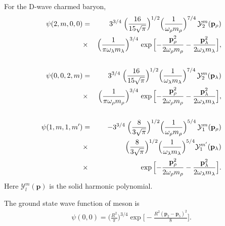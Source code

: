 \documentclass[twocolumn,superscriptaddress,preprintnumbers,nofootinbib]{revtex4}
\begin{document}
For the D-wave charmed baryon,
\begin{eqnarray}
\psi
(2,m,0,0)&=&3^{3/4}\;\Big(\frac{16}{15\sqrt{\pi}}\Big)^{{1}/{2}}\Big(\frac{1}{
\omega_{\rho}m_{\rho}}\Big)^{{7}/{4}}\,{\cal
Y}^m_2({\mathbf{p}}_{\rho})\nonumber\\&\times&\Big(\frac{1}{\pi
\omega_{\lambda}m_{\lambda}}\Big)^{{3}/{4}}\,\exp\Big[{-\frac{{\mathbf{p}}^2_{\rho}}{2\omega_{\rho}m_{\rho}}
-\frac{{\mathbf{p}}^2_{\lambda}}{2\omega_{\lambda}m_{\lambda}}}\Big], \nonumber\\&&\\
\psi(0,0,2,m)&=&3^{3/4}\;\Big(\frac{16}{15\sqrt{\pi}}\Big)^{{1}/{2}}\Big(\frac{1}{
\omega_{\lambda}m_{\lambda}}\Big)^{{7}/{4}}\,{\cal
Y}^m_2({\mathbf{p}}_{\lambda})\nonumber\\&\times&\Big(\frac{1}{\pi
\omega_{\rho}m_{\rho}}\Big)^{{3}/{4}}\,\exp\Big[{-\frac{{\mathbf{p}}^2_{\rho}}{2\omega_{\rho}m_{\rho}}
-\frac{ {\mathbf{p}}^2_{\lambda}}{2\omega_{\lambda}m_{\lambda}}}\Big],\nonumber\\&&\\
\psi(1,m,1,m')&=&-3^{3/4}\;\Big(\frac{8}{3\sqrt{\pi}}\Big)^{{1}/{2}}\Big(\frac{1}{
\omega_{\rho}m_{\rho}}\Big)^{{5}/{4}}\,{\cal Y}^m_1(
{\mathbf{p}}_{\rho})\nonumber\\&\times&\Big(\frac{8}{3\sqrt{\pi}}\Big)^{{1}/{2}}\Big(\frac{1}{
\omega_{\lambda}m_{\lambda}}\Big)^{{5}/{4}}{\cal
Y}^{m'}_1({\mathbf{p}}_{\lambda})\nonumber\\&\times&
\exp\Big[{-\frac{{\mathbf{p}}^2_{\rho}}{2\omega_{\rho}m_{\rho}}
-\frac{{\mathbf{p}}^2_{\lambda}}{2\omega_{\lambda}m_{\lambda}}}\Big].
\end{eqnarray}
Here $\mathcal{Y}_{l}^{m}(\mathbf{p})$ is the solid harmonic
polynomial.

The ground state wave function of meson is
\begin{eqnarray}
\psi(0,0)=\Big(\frac{{R}^2}{\pi}\Big)^{{3}/{4}} \exp
\Big[-\frac{R^2({\mathbf{p}}_2-{\mathbf{p}}_5)^2}{8}\Big].
\end{eqnarray}



\end{document}
